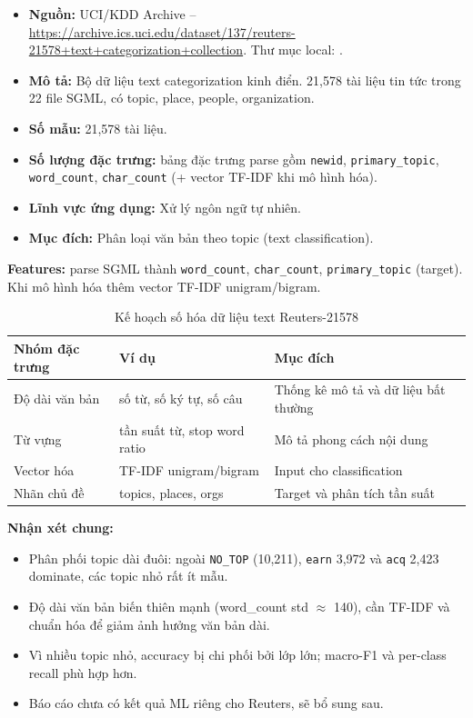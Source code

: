 \begin{itemize}
 \item \textbf{Nguồn:} UCI/KDD Archive -- \url{https://archive.ics.uci.edu/dataset/137/reuters-21578+text+categorization+collection}. Thư mục local: .
 \item \textbf{Mô tả:} Bộ dữ liệu text categorization kinh điển. 21,578 tài liệu tin tức trong 22 file SGML, có topic, place, people, organization.
 \item \textbf{Số mẫu:} 21,578 tài liệu.
 \item \textbf{Số lượng đặc trưng:} bảng đặc trưng parse gồm \texttt{newid}, \texttt{primary\_topic}, \texttt{word\_count}, \texttt{char\_count} (+ vector TF-IDF khi mô hình hóa).
 \item \textbf{Lĩnh vực ứng dụng:} Xử lý ngôn ngữ tự nhiên.
 \item \textbf{Mục đích:} Phân loại văn bản theo topic (text classification).
\end{itemize}

\textbf{Features:} parse SGML thành \texttt{word\_count}, \texttt{char\_count}, \texttt{primary\_topic} (target). Khi mô hình hóa thêm vector TF-IDF unigram/bigram.

\begin{table}[H]
\centering
\caption{Kế hoạch số hóa dữ liệu text Reuters-21578}
\label{tab:reuters_feature_plan}
\small
\begin{tabular}{lll}
\toprule
Nhóm đặc trưng & Ví dụ & Mục đích \\
\midrule
Độ dài văn bản & số từ, số ký tự, số câu & Thống kê mô tả và dữ liệu bất thường \\
Từ vựng & tần suất từ, stop word ratio & Mô tả phong cách nội dung \\
Vector hóa & TF-IDF unigram/bigram & Input cho classification \\
Nhãn chủ đề & topics, places, orgs & Target và phân tích tần suất \\
\bottomrule
\end{tabular}
\end{table}

\textbf{Nhận xét chung:}
\begin{itemize}
 \item Phân phối topic dài đuôi: ngoài \texttt{NO\_TOP} (10,211), \texttt{earn} 3,972 và \texttt{acq} 2,423 dominate, các topic nhỏ rất ít mẫu.
 \item Độ dài văn bản biến thiên mạnh (word\_count std $\approx$ 140), cần TF-IDF và chuẩn hóa để giảm ảnh hưởng văn bản dài.
 \item Vì nhiều topic nhỏ, accuracy bị chi phối bởi lớp lớn; macro-F1 và per-class recall phù hợp hơn.
 \item Báo cáo chưa có kết quả ML riêng cho Reuters, sẽ bổ sung sau.
\end{itemize}

